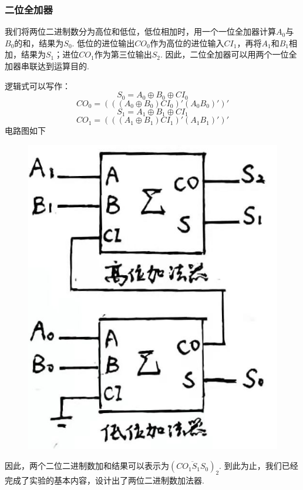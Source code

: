 \documentclass[UTF8]{ctexart}
\begin{document}
{\subsubsection{二位全加器}
我们将两位二进制数分为高位和低位，低位相加时，用一个一位全加器计算$A_0$与$B_0$的和，结果为$S_0$. 低位的进位输出$CO_0$作为高位的进位输入$CI_1$，再将$A_1$和$B_1$相加，结果为$S_1$；进位$CO_1$作为第三位输出$S_2$. 因此，二位全加器可以用两个一位全加器串联达到运算目的.\par
逻辑式可以写作：
\[S_0 = A_0\oplus B_0 \oplus CI_0\]
\[CO_0 = (((A_0\oplus B_0)CI_0)'(A_0B_0)')'\]
\[S_1 = A_1\oplus B_1 \oplus CI_1\]
\[CO_1 = (((A_1\oplus B_1)CI_1)'(A_1B_1)')'\]
电路图如下
\begin{figure}[H]\begin{center}
    \includegraphics[scale=0.3]{3.jpg}
\end{center}\end{figure}
因此，两个二位二进制数加和结果可以表示为$(\overline{CO_1S_1S_0})_2$. 
到此为止，我们已经完成了实验的基本内容，设计出了两位二进制数加法器.

}
\end{document}
